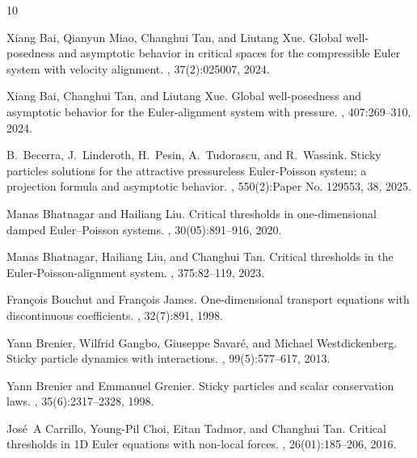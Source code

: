 \documentclass[11pt,reqno]{amsart}
\theoremstyle{definition}
\theoremstyle{remark}
\begin{document}
	\begin{thebibliography}{10}
		
		Xiang Bai, Qianyun Miao, Changhui Tan, and Liutang Xue.
		\newblock Global well-posedness and asymptotic behavior in critical spaces for
		the compressible {E}uler system with velocity alignment.
		, 37(2):025007, 2024.
		
		Xiang Bai, Changhui Tan, and Liutang Xue.
		\newblock Global well-posedness and asymptotic behavior for the
		{E}uler-alignment system with pressure.
		, 407:269--310, 2024.
		
		B.~Becerra, J.~Linderoth, H.~Pesin, A.~Tudorascu, and R.~Wassink.
		\newblock Sticky particles solutions for the attractive pressureless
		{E}uler-{P}oisson system; a projection formula and asymptotic behavior.
		, 550(2):Paper No. 129553, 38, 2025.
		
		Manas Bhatnagar and Hailiang Liu.
		\newblock Critical thresholds in one-dimensional damped {E}uler--{P}oisson
		systems.
		,
		30(05):891--916, 2020.
		
		Manas Bhatnagar, Hailiang Liu, and Changhui Tan.
		\newblock Critical thresholds in the {E}uler-{P}oisson-alignment system.
		, 375:82--119, 2023.
		
		Fran{\c{c}}ois Bouchut and Fran{\c{c}}ois James.
		\newblock One-dimensional transport equations with discontinuous coefficients.
		, 32(7):891, 1998.
		
		Yann Brenier, Wilfrid Gangbo, Giuseppe Savar{\'e}, and Michael Westdickenberg.
		\newblock Sticky particle dynamics with interactions.
		,
		99(5):577--617, 2013.
		
		Yann Brenier and Emmanuel Grenier.
		\newblock Sticky particles and scalar conservation laws.
		, 35(6):2317--2328, 1998.
		
		Jos{\'e}~A Carrillo, Young-Pil Choi, Eitan Tadmor, and Changhui Tan.
		\newblock Critical thresholds in {1D} {E}uler equations with non-local forces.
		,
		26(01):185--206, 2016.
		

\end{thebibliography}
\end{document}

